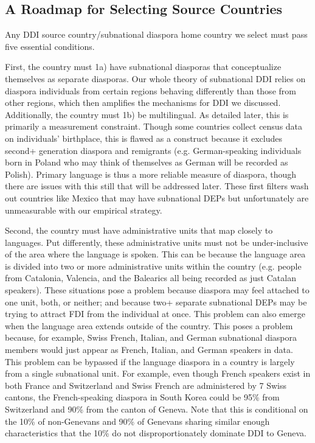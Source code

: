 \documentclass[12pt]{article}
\let\oldsubsection\subsection
\renewcommand{\subsection}{\FloatBarrier\oldsubsection}
\begin{document}
        \subsection{A Roadmap for Selecting Source Countries} \label{ss:source_country_roadmap}
Any DDI source country/subnational diaspora home country we select must pass five essential conditions. 

    First, the country must 1a) have subnational diasporas that conceptualize themselves as separate diasporas. Our whole theory of subnational DDI relies on diaspora individuals from certain regions behaving differently than those from other regions, which then amplifies the mechanisms for DDI we discussed. Additionally, the country must 1b) be multilingual. As detailed later, this is primarily a measurement constraint. Though some countries collect census data on individuals' birthplace, this is flawed as a construct because it excludes second+ generation  diaspora and remigrants (e.g. German-speaking individuals born in Poland who may think of themselves as German will be recorded as Polish). Primary language is thus a more reliable measure of diaspora, though there are issues with this still that will be addressed later. These first filters wash out countries like Mexico that may have subnational DEPs but unfortunately are unmeasurable with our empirical strategy.

    Second, the country must have administrative units that map closely to languages. Put differently, these administrative units must not be under-inclusive of the area where the language is spoken. This can be because the language area is divided into two or more administrative units within the country (e.g. people from Catalonia, Valencia, and the Balearics all being recorded as just Catalan speakers). These situations pose a problem because diaspora may feel attached to one unit, both, or neither; and because two+ separate subnational DEPs may be trying to attract FDI from the individual at once. This problem can also emerge when the language area extends outside of the country. This poses a problem because, for example, Swiss French, Italian, and German subnational diaspora members would just appear as French, Italian, and German speakers in data. This problem can be bypassed if the language diaspora in a country is  largely from a single subnational unit. For example, even though French speakers exist in both France and Switzerland and Swiss French are administered by 7 Swiss cantons, the French-speaking diaspora in South Korea could be 95\% from Switzerland and 90\% from the canton of Geneva. Note that this is conditional on the 10\%  of non-Genevans and 90\% of Genevans sharing similar enough characteristics that the 10\% do not disproportionately dominate DDI to Geneva.
\end{document}
